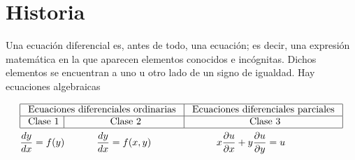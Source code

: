 \section{Historia}

Una ecuación diferencial es, antes de todo, una ecuación; es decir, una expresión matemática en la que aparecen elementos conocidos e incógnitas. Dichos elementos se encuentran a uno u otro lado de un signo de igualdad. Hay ecuaciones algebraicas

\[
\begin{aligned}
&\begin{array}{|c|c|c|}
\hline \multicolumn{2}{|c|} {\text { Ecuaciones diferenciales ordinarias }} & \text { Ecuaciones diferenciales parciales } \\
\hline \text { Clase } 1 & \text { Clase } 2 & \text { Clase } 3 \\
\hline
\end{array}\\
&\frac{d y}{d x}=f(y) \quad \hspace{8mm}\frac{d y}{d x}=f(x, y) \quad \hspace{20mm} x \frac{\partial u}{\partial x}+y \frac{\partial u}{\partial y}=u
\end{aligned}
\]

